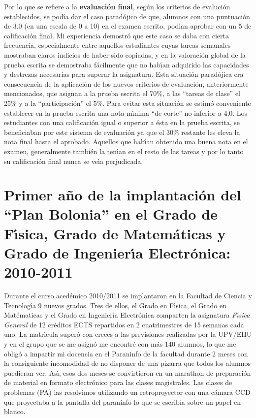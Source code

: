 Por lo que se refiere a la {\bf evaluaci\'{o}n final},
seg\'{u}n los criterios de evaluci\'{o}n establecidos,
 se pod\'{\i}a dar el caso parad\'{o}jico de que, 
alumnos con una puntuaci\'{o}n de 3.0 (en una escala de 0 a 10)
en el examen escrito, pod\'{\i}an aprobar con un 5 de calificaci\'{o}n final.
Mi experiencia demostr\'{o} que este caso se daba con cierta frecuencia,
especialmente entre aquellos estudiantes cuyas tareas semanales
mostraban claros  indicios de haber sido copiadas, y en la valoraci\'{o}n
global de la prueba escrita se demostraba  f\'{a}cilmente  que no hab\'{\i}an
adquirido las capacidades y destrezas necesarias para superar la asignatura.
Esta situaci\'{o}n parad\'{o}jica era consecuencia de la aplicaci\'{o}n de
los nuevos criterios de evaluaci\'{o}n, anteriormente mencionados, que
asignan a la prueba escrita el 70\%, a las ``tareas de clase'' el 25\%
y a la ``participaci\'{o}n'' el 5\%.
Para evitar esta situaci\'{o}n se  estim\'{o} conveniente  establecer
 en la prueba escrita una nota m\'{\i}nima ``de corte'' no inferior a 4,0.
Los estudiantes con una calificaci\'{o}n  igual 
o superior a \'{e}sta   en la prueba escrita, se  beneficiaban
por este sistema de evaluaci\'{o}n ya que el 30\% restante les eleva la
nota final hasta el aprobado.
Aquellos que hab\'{\i}an obtenido una buena nota en el 
examen, generalmente tambi\'{e}n la ten\'{\i}an en el resto
de las tareas y por lo tanto su calificaci\'{o}n final nunca 
se ve\'{\i}a perjudicada. 


\section{Primer a\~{n}o de la implantaci\'{o}n del ``Plan Bolonia'' en el Grado de F\'{\i}sica, Grado de Matem\'{a}ticas y Grado de Ingenier\'{\i}a Electr\'{o}nica: 2010-2011}

Durante el curso aced\'{e}mico 2010/2011 se implantaron en la Facultad de Ciencia 
y Tecnolog\'{\i}a 9 nuevos grados.
Tres de ellos, 
 el Grado en F\'{\i}sica, el Grado en Mat\'{e}maticas 
y el Grado en Ingenier\'{\i}a Electr\'{o}nica 
comparten la asignatura {\it F\'{\i}sica General} de 12 cr\'{e}ditos ECTS repartidos
en 2 cuatrimestres de 15 semanas cada uno.
La matr\'{\i}cula super\'{o} con creces a las previsiones realizadas por la UPV/EHU y en
 el grupo que se me asign\'{o} me encontr\'{e} con m\'{a}s 140 alumnos, lo que 
me oblig\'{o} a impartir mi docencia en el Paraninfo de la facultad durante 2 meses con 
la consiguiente incomodidad de no disponer de  una pizarra que todos los alumnos puedieran
ver. As\'{\i}, esos dos meses se convirtieron en un marathon de preparaci\'{o}n 
de material en formato electr\'{o}nico para las clases magistrales. Las clases
de problemas (PA) las resolvimos utilizando un retroproyector con una c\'{a}mara CCD que proyectaba a la pantalla del paraninfo lo que se escrib\'{\i}a sobre un papel 
en blanco.


